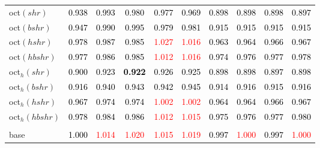 \begin{tabular}[t]{l|ccccccccc}
oct$(shr)$ & \textcolor{black}{0.938} & \textcolor{black}{0.993} & \textcolor{black}{0.980} & \textcolor{black}{0.977} & \textcolor{black}{0.969} & \textcolor{black}{0.898} & \textcolor{black}{0.898} & \textcolor{black}{0.898} & \textcolor{black}{0.897}\\
oct$(bshr)$ & \textcolor{black}{0.947} & \textcolor{black}{0.990} & \textcolor{black}{0.995} & \textcolor{black}{0.979} & \textcolor{black}{0.981} & \textcolor{black}{0.915} & \textcolor{black}{0.915} & \textcolor{black}{0.915} & \textcolor{black}{0.915}\\
oct$(hshr)$ & \textcolor{black}{0.978} & \textcolor{black}{0.987} & \textcolor{black}{0.985} & \textcolor{red}{1.027} & \textcolor{red}{1.016} & \textcolor{black}{0.963} & \textcolor{black}{0.964} & \textcolor{black}{0.966} & \textcolor{black}{0.967}\\
oct$(hbshr)$ & \textcolor{black}{0.977} & \textcolor{black}{0.986} & \textcolor{black}{0.985} & \textcolor{red}{1.012} & \textcolor{red}{1.016} & \textcolor{black}{0.974} & \textcolor{black}{0.976} & \textcolor{black}{0.977} & \textcolor{black}{0.978}\\
oct$_h(shr)$ & \textcolor{black}{0.900} & \textcolor{black}{0.923} & \textcolor{black}{\textbf{0.922}} & \textcolor{black}{0.926} & \textcolor{black}{0.925} & \textcolor{black}{0.898} & \textcolor{black}{0.898} & \textcolor{black}{0.897} & \textcolor{black}{0.898}\\
oct$_h(bshr)$ & \textcolor{black}{0.916} & \textcolor{black}{0.940} & \textcolor{black}{0.943} & \textcolor{black}{0.942} & \textcolor{black}{0.945} & \textcolor{black}{0.914} & \textcolor{black}{0.916} & \textcolor{black}{0.915} & \textcolor{black}{0.916}\\
oct$_h(hshr)$ & \textcolor{black}{0.967} & \textcolor{black}{0.974} & \textcolor{black}{0.974} & \textcolor{red}{1.002} & \textcolor{red}{1.002} & \textcolor{black}{0.964} & \textcolor{black}{0.964} & \textcolor{black}{0.966} & \textcolor{black}{0.967}\\
oct$_h(hbshr)$ & \textcolor{black}{0.978} & \textcolor{black}{0.984} & \textcolor{black}{0.986} & \textcolor{red}{1.012} & \textcolor{red}{1.015} & \textcolor{black}{0.975} & \textcolor{black}{0.976} & \textcolor{black}{0.977} & \textcolor{black}{0.980}\\
\addlinespace[0.3em]
\multicolumn{10}{c}{\textbf{$k = 1$}}\\
base & \textcolor{black}{1.000} & \textcolor{red}{1.014} & \textcolor{red}{1.020} & \textcolor{red}{1.015} & \textcolor{red}{1.019} & \textcolor{black}{0.997} & \textcolor{red}{1.000} & \textcolor{black}{0.997} & \textcolor{red}{1.000}\\

\end{tabular}
